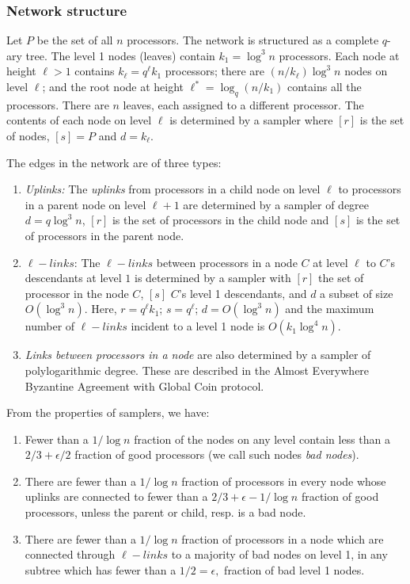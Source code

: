 \documentclass{sig-alternate}
\begin{document}
\subsubsection{Network structure}

Let $P$ be the set of all $n$ processors. 
The network is structured as a complete $q$-ary  tree. The level 1 nodes (leaves) contain $k_1=\log^3 n$ processors.  Each node at height $\ell >1$ contains $k_{\ell}=q^{\ell} k_1$ processors; there are $(n/ k_{\ell}) \log^3 n$ nodes on level $\ell$; and the root node at height $\ell^*=\log_q (n/k_1)$ contains all the processors.  There are $n$ leaves, each assigned to a different processor.  The contents of each node on level $\ell$ is determined by  a sampler where $[r] $ is the set of nodes, $[s]= P$ and $d =k_{\ell}$. 

The edges in the network are of three types:
\begin{enumerate}
\item
{\it Uplinks:}   The {\it uplinks}  from  processors in a child node on level $\ell$  to processors in a parent node on level $\ell+1$ are determined by a sampler
of degree  $d=q \log^3  n$, $[r]$ is the set of processors in the child node and $[s]$ is the set of processors in the parent node.  
\item
$ \ell-links$:  The $  \ell- links$  between  processors in a node $C$ at level $\ell$ to $C$'s descendants at level $1$ is determined by a sampler with $[r]$ the set of processor in the node $C$, $[s]$ $C$'s level 1 descendants, and $d$ a subset of size $O(\log^3 n)$.  Here, $r=q^{\ell} k_1$; $s=q^{\ell}$; $d=O(\log^3 n)$
and the maximum number of $\ell-links$ incident to  a level 1 node is $O(k_1 \log^4n)$.

\item
{\it Links between processors in a node} are also determined by a sampler of polylogarithmic degree. These are described in the Almost Everywhere Byzantine Agreement with Global Coin protocol. 
\end{enumerate}


From the properties of samplers,  we have: 
\begin{enumerate}
\item Fewer than a $1/\log n$ fraction of the nodes on any level contain less than a $2/3 + \epsilon/2$ fraction of good processors (we call such nodes {\it bad nodes}). 
\item  There are fewer than a $1/\log n$ fraction of processors in every node whose uplinks are connected to fewer than a $2/3 +\epsilon -1/\log n$ fraction of good processors, unless the parent or child, resp. is a bad node.
\item
There are fewer than a $1/\log n$ fraction of processors in a node which are connected  through $\ell-links$ to a majority of bad nodes on level 1, in any subtree which has fewer than a $1/2 =\epsilon,$ fraction of bad level 1 nodes. 
\end{enumerate}
\end{document}
